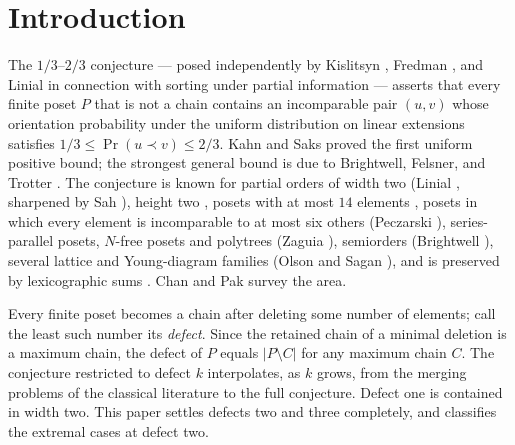 \documentclass[11pt]{article}
\theoremstyle{definition}
\theoremstyle{remark}
\newcommand{\pr}{\operatorname{Pr}}
\begin{document}
\section{Introduction}
The $1/3$--$2/3$ conjecture --- posed independently by Kislitsyn \cite{kislitsyn},
Fredman \cite{fredman}, and Linial \cite{linial} in connection with sorting under partial
information --- asserts that every finite poset $P$ that is not a chain contains an
incomparable pair $(u,v)$ whose orientation probability under the uniform distribution on
linear extensions satisfies $1/3\le\pr(u\prec v)\le 2/3$. Kahn and Saks \cite{kahn-saks}
proved the first uniform positive bound; the strongest general bound is due to Brightwell,
Felsner, and Trotter \cite{bft}. The conjecture is known for partial orders of width two
(Linial \cite{linial}, sharpened by Sah \cite{sah}), height two \cite{tgf}, posets with at
most $14$ elements \cite{deloof,gupta}, posets in which every element is incomparable to
at most six others (Peczarski \cite{peczarski-thin}), series-parallel posets, $N$-free
posets and polytrees (Zaguia \cite{zaguia-nfree,zaguia-polytree}), semiorders (Brightwell
\cite{brightwell-semi}), several lattice and Young-diagram families (Olson and Sagan
\cite{olson-sagan}), and is preserved by lexicographic sums \cite{dolores-cuenca}. Chan
and Pak \cite{chan-pak} survey the area.

Every finite poset becomes a chain after deleting some number of elements; call the least
such number its \emph{defect}. Since the retained chain of a minimal deletion is a
maximum chain, the defect of $P$ equals $|P\setminus C|$ for any maximum chain $C$. The
conjecture restricted to defect $k$ interpolates, as $k$ grows, from the merging problems
of the classical literature to the full conjecture. Defect one is contained in width two.
This paper settles defects two and three completely, and classifies the extremal cases at
defect two.
\end{document}
